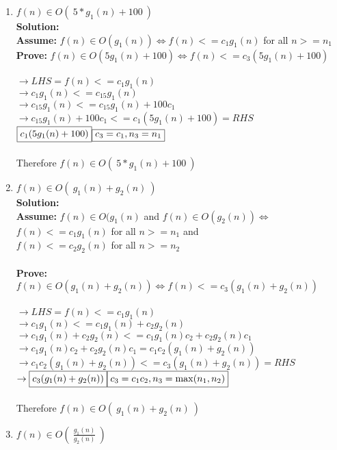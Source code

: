 \documentclass[12pt]{elsart}
\begin{document}
\begin{enumerate}
\begin{enumerate}
   \item $f(n)\in O( \ 5*g_1(n)+100\ )$\\
	{\bf Solution:}\\
	{\bf Assume:} $f(n)\in O(g_1(n)) \Leftrightarrow f(n)<=c_1g_1(n)$ for all $n >= n_1$\\
	{\bf Prove:} $f(n) \in O(5g_1(n)+100) \Leftrightarrow f(n) <= c_3(5g_1(n)+100)$\\\\
	$\rightarrow LHS = f(n) <= c_1g_1(n)$\\
	$\rightarrow c_1g_1(n) <= c_15g_1(n)$\\
	$\rightarrow c_15g_1(n) <= c_15g_1(n)+100c_1$\\
	$\rightarrow c_15g_1(n)+100c_1 <= c_1(5g_1(n)+100) = RHS$\\
	$\boxed{c_1(5g_1(n)+100)} \hfill \boxed{c_3=c_1, n_3=n_1}$\\\\
	Therefore $f(n)\in O( \ 5*g_1(n)+100\ )$\\
   \item $f(n)\in O( \ g_1(n)+g_2(n)\ )$\\
	{\bf Solution:}\\
	{\bf Assume:} $f(n)\in O(g_1(n)$ and $f(n)\in O(g_2(n)) \Leftrightarrow$\\
	$ f(n) <= c_1g_1(n)$ for all $n>=n_1$ and\\ 
	$f(n) <= c_2g_2(n)$ for all $n>=n_2$\\\\
	{\bf Prove:} $f(n)\in O(g_1(n)+g_2(n))\Leftrightarrow f(n) <= c_3(g_1(n)+g_2(n))$\\\\
	$\rightarrow LHS = f(n) <= c_1g_1(n)$\\
	$\rightarrow c_1g_1(n) <= c_1g_1(n) + c_2g_2(n)$\\
	$\rightarrow c_1g_1(n) + c_2g_2(n) <= c_1g_1(n)c_2 + c_2g_2(n)c_1$\\
	$\rightarrow c_1g_1(n)c_2 + c_2g_2(n)c_1 = c_1c_2(g_1(n)+g_2(n))$\\
	$\rightarrow c_1c_2(g_1(n)+g_2(n)) <= c_3(g_1(n)+g_2(n)) = RHS$\\
	$\rightarrow \boxed{c_3(g_1(n)+g_2(n))}\hfill \boxed{c_3=c_1c_2, n_3=\max(n_1,n_2)}$\\\\
	Therefore $f(n)\in O( \ g_1(n)+g_2(n)\ )$\\
   \item $f(n)\in O( \ \frac{g_1(n)}{g_2(n)}\ )$\\

\end{enumerate}
\end{enumerate}
\end{document}
